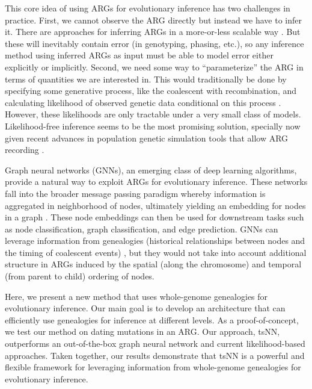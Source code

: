 This core idea of using ARGs for evolutionary inference has two challenges in practice. 
First, we cannot observe the ARG directly but instead we have to infer it. 
There are approaches for inferring ARGs in a more-or-less scalable way \citep{speidel_inferring_2021, kelleher_inferring_2019, zhang_biobank-scale_2023}. 
But these will inevitably contain error (\eg in genotyping, phasing, etc.),
so any inference method using inferred ARGs as input must be able to model error either explicitly or implicitly.
Second, we need some way to ``parameterize'' the ARG in terms of quantities we are interested in. 
This would traditionally be done by specifying some generative process, like the coalescent with recombination,
and calculating likelihood of observed genetic data conditional on this process \citep{fan_likelihood-based_2023}. 
However, these likelihoods are only tractable under a very small class of models. 
Likelihood-free inference seems to be the most promising solution,
specially now given recent advances in population genetic simulation tools that allow ARG recording \citep{haller_tree-sequence_2019, kelleher_efficient_2016, ralph_efficiently_2020}. 

Graph neural networks (GNNs), an emerging class of deep learning algorithms, provide a natural way to exploit ARGs for evolutionary inference.
These networks fall into the broader message passing paradigm whereby information is aggregated in neighborhood of nodes,
ultimately yielding an embedding for nodes in a graph \citep{bronstein_geometric_2017, battaglia_relational_2018, hamilton_inductive_2018}.
These node embeddings can then be used for downstream tasks such as node classification, graph classification, and edge prediction.
GNNs can leverage information from genealogies (\ie historical relationships between nodes and the timing of coalescent events) \citep{korfmann_simultaneous_2023},
but they would not take into account additional structure in ARGs induced by the spatial (along the chromosome) and temporal (from parent to child) ordering of nodes.

Here, we present a new method that uses whole-genome genealogies for evolutionary inference.
Our main goal is to develop an architecture that can efficiently use genealogies for inference at different levels.
As a proof-of-concept, we test our method on dating mutations in an ARG.
Our approach, tsNN, outperforms an out-of-the-box graph neural network and current likelihood-based approaches.
Taken together, our results demonstrate that tsNN is a powerful and flexible framework for leveraging information from whole-genome genealogies for evolutionary inference.

